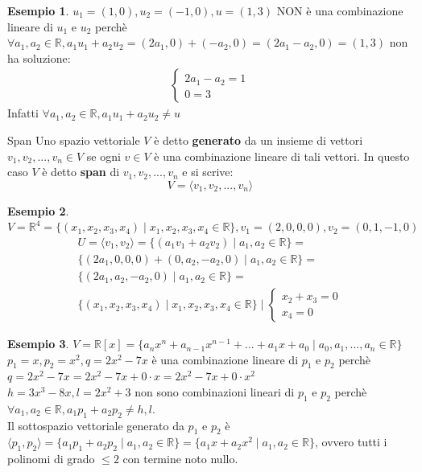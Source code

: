 \documentclass[a4paper]{article}
\theoremstyle{definition}
\newtheorem*{es}{Esempio}
\begin{document}
\begin{es}
	$u_1 = (1, 0), u_2 = (-1, 0), u = (1, 3)$ NON è una combinazione lineare di $u_1$ e $u_2$ perchè
	$\forall a_1, a_2 \in \mathbb{R}, a_1u_1 + a_2u_2 = (2a_1, 0) + (-a_2, 0) = (2a_1 - a_2, 0) = (1, 3)$ non ha soluzione:
	\begin{align*}
		\begin{cases}
			2a_1 - a_2 = 1 \\
			0 = 3
		\end{cases}
	\end{align*}
	Infatti $\forall a_1, a_2 \in \mathbb{R},a_1u_1 + a_2u_2 \ne u$
\end{es}
\begin{deff}{Span}{}
	Uno spazio vettoriale $V$ è detto \textbf{generato} da un insieme di vettori $v_1, v_2, ..., v_n \in V$ se ogni $v \in V$ è una combinazione lineare di tali vettori.
	In questo caso $V$ è detto \textbf{span} di $v_1, v_2, ..., v_n$ e si scrive:
	\[ V = \langle v_1, v_2, ..., v_n \rangle \]
\end{deff}
\begin{es}
	$V = \mathbb{R}^4 = \{(x_1, x_2, x_3, x_4) \mid x_1, x_2, x_3, x_4 \in \mathbb{R}\}, v_1 = (2, 0, 0, 0), v_2 = (0, 1, -1, 0)$
	\begin{align*}
		U = \langle v_1, v_2 \rangle = \{(a_1v_1 + a_2v_2) \mid a_1, a_2 \in \mathbb{R}\} = \\
		\{(2a_1, 0, 0, 0) + (0, a_2, -a_2, 0) \mid a_1, a_2 \in \mathbb{R}\} =              \\
		\{(2a_1, a_2, -a_2, 0) \mid a_1, a_2 \in \mathbb{R}\} =                             \\
		\{(x_1, x_2, x_3, x_4) \mid x_1, x_2, x_3, x_4 \in \mathbb{R}\} \mid \begin{cases}
			                                                                     x_2 + x_3 = 0 \\
			                                                                     x_4 = 0
		                                                                     \end{cases}
	\end{align*}
\end{es}
\begin{es}
	$V = \mathbb{R}[x] = \{a_nx^n + a_{n-1}x^{n-1} + ... + a_1x + a_0 \mid a_0, a_1, ..., a_n \in \mathbb{R}\}$ \\
	$p_1 = x, p_2 = x^2, q = 2x^2 - 7x$ è una combinazione lineare di $p_1$ e $p_2$ perchè $q = 2x^2 - 7x = 2x^2 - 7x + 0 \cdot x = 2x^2 - 7x + 0 \cdot x^2$ \\
	$h = 3x^3 - 8x, l = 2x^2 + 3$ non sono combinazioni lineari di $p_1$ e $p_2$ perchè $\forall a_1, a_2 \in \mathbb{R}, a_1p_1 + a_2p_2 \ne h, l$. \\
	Il sottospazio vettoriale generato da $p_1$ e $p_2$ è $\langle p_1, p_2 \rangle = \{a_1p_1 + a_2p_2 \mid a_1, a_2 \in \mathbb{R}\} = \{a_1x + a_2x^2 \mid a_1, a_2 \in \mathbb{R}\}$, ovvero tutti i polinomi di grado $\le 2$ con termine noto nullo.
\end{es}
\end{document}

